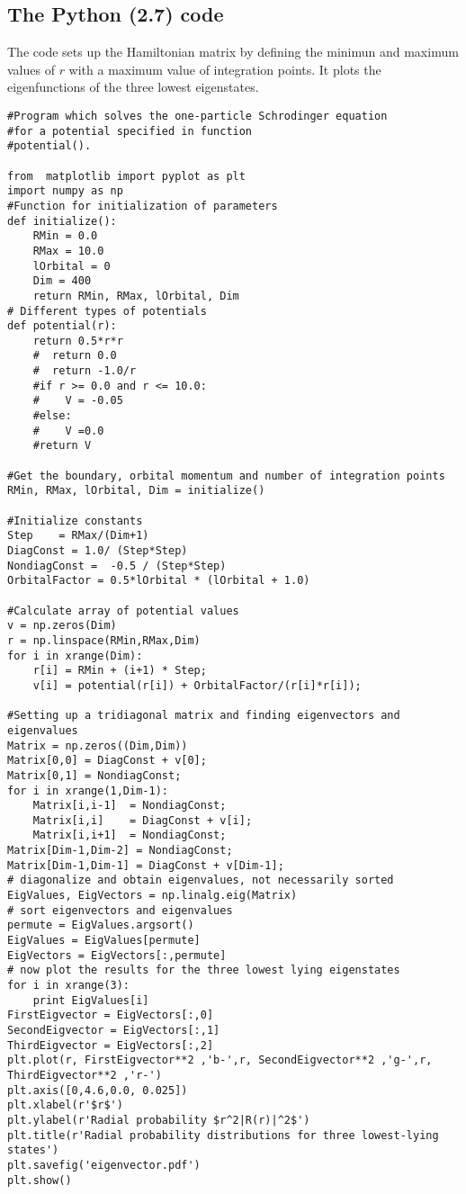 \subsection{The Python (2.7) code}
The code sets up the Hamiltonian matrix by defining the minimun and maximum values of $r$ with a
maximum value of integration points. It plots the
eigenfunctions of the three lowest eigenstates.
\begin{lstlisting}
#Program which solves the one-particle Schrodinger equation
#for a potential specified in function
#potential().

from  matplotlib import pyplot as plt
import numpy as np
#Function for initialization of parameters
def initialize():
    RMin = 0.0
    RMax = 10.0
    lOrbital = 0
    Dim = 400
    return RMin, RMax, lOrbital, Dim
# Different types of potentials
def potential(r):
    return 0.5*r*r
    #  return 0.0
    #  return -1.0/r
    #if r >= 0.0 and r <= 10.0:
    #    V = -0.05
    #else:
    #    V =0.0
    #return V

#Get the boundary, orbital momentum and number of integration points
RMin, RMax, lOrbital, Dim = initialize()

#Initialize constants
Step    = RMax/(Dim+1)
DiagConst = 1.0/ (Step*Step)
NondiagConst =  -0.5 / (Step*Step)
OrbitalFactor = 0.5*lOrbital * (lOrbital + 1.0)

#Calculate array of potential values
v = np.zeros(Dim)
r = np.linspace(RMin,RMax,Dim)
for i in xrange(Dim):
    r[i] = RMin + (i+1) * Step;
    v[i] = potential(r[i]) + OrbitalFactor/(r[i]*r[i]);

#Setting up a tridiagonal matrix and finding eigenvectors and eigenvalues
Matrix = np.zeros((Dim,Dim))
Matrix[0,0] = DiagConst + v[0];
Matrix[0,1] = NondiagConst;
for i in xrange(1,Dim-1):
    Matrix[i,i-1]  = NondiagConst;
    Matrix[i,i]    = DiagConst + v[i];
    Matrix[i,i+1]  = NondiagConst;
Matrix[Dim-1,Dim-2] = NondiagConst;
Matrix[Dim-1,Dim-1] = DiagConst + v[Dim-1];
# diagonalize and obtain eigenvalues, not necessarily sorted
EigValues, EigVectors = np.linalg.eig(Matrix)
# sort eigenvectors and eigenvalues
permute = EigValues.argsort()
EigValues = EigValues[permute]
EigVectors = EigVectors[:,permute]
# now plot the results for the three lowest lying eigenstates
for i in xrange(3):
    print EigValues[i]
FirstEigvector = EigVectors[:,0]
SecondEigvector = EigVectors[:,1]
ThirdEigvector = EigVectors[:,2]
plt.plot(r, FirstEigvector**2 ,'b-',r, SecondEigvector**2 ,'g-',r, ThirdEigvector**2 ,'r-')
plt.axis([0,4.6,0.0, 0.025])
plt.xlabel(r'$r$')
plt.ylabel(r'Radial probability $r^2|R(r)|^2$')
plt.title(r'Radial probability distributions for three lowest-lying states')
plt.savefig('eigenvector.pdf')
plt.show()
\end{lstlisting}


